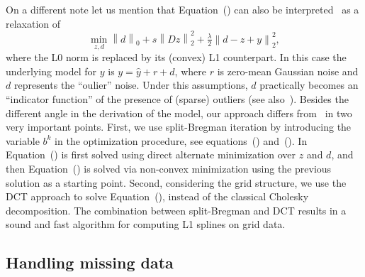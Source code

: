 \documentclass[preprint]{imsart}
\newcommand{\norm}[2]{\left\| #1 \right\|_{#2}}
\begin{document}
On a different note let us mention that Equation~() can also be interpreted~\cite{mateos12} as a relaxation of
\begin{equation}
    \min_{z, d} \norm{d}{0} + s \norm{Dz}{2}^2 + \tfrac{\lambda}{2} \norm{d-z+y}{2}^2 ,
    \label{eq:L0formulation}
\end{equation}
where the L0 norm is replaced by its (convex) L1 counterpart. In this case the underlying model for $y$ is $y = \hat{y} + r + d$, where $r$ is zero-mean Gaussian noise and $d$ represents the ``oulier'' noise. Under this assumptions, $d$ practically becomes an ``indicator function'' of the presence of (sparse) outliers (see also~\cite{black91}). Besides the different angle in the derivation of the model, our approach differs from~\cite{mateos12} in two very important points. First, we use split-Bregman iteration by introducing the variable $b^k$ in the optimization procedure, see equations~() and~(). In~\cite{mateos12} Equation~() is first solved using direct alternate minimization over $z$ and $d$, and then Equation~() is solved via non-convex minimization using the previous solution as a starting point.
Second, considering the grid structure, we use the DCT approach to solve Equation~(), instead of the classical Cholesky decomposition. The combination between split-Bregman and DCT results in a sound and fast algorithm for computing L1 splines on grid data.


\subsection{Handling missing data}
\end{document}
